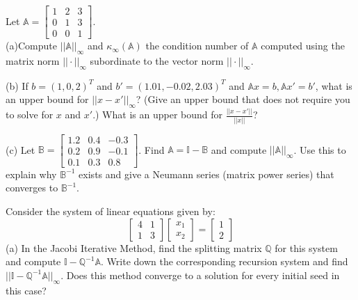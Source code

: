 \documentclass[12pt]{article}
\begin{document}
\vspace{2in}

Let $\mathbb{A} = \begin{bmatrix} 1 & 2 & 3 \\ 0 & 1 & 3 \\ 0 & 0 & 1 \end{bmatrix}$. \\
(a)Compute $||\mathbb{A}||_{\infty}$ and $\kappa_{\infty}(\mathbb{A})$ the condition number of $\mathbb{A}$ computed 
using the matrix norm $||\cdot ||_{\infty}$ subordinate to the vector norm $|| \cdot ||_{\infty}$. \\

\vspace{2in}

\noindent
(b) If $b=(1,0,2)^T$ and $b'=(1.01,-0.02, 2.03)^T$ and $\mathbb{A}x=b, \mathbb{A}x'=b'$, 
what is an upper bound for $||x-x'||_{\infty}$? (Give an upper bound that does not require you to solve for $x$ and $x'$.) What is an upper bound for $\frac{||x-x'||}{||x||}$?

\vspace{ 2in}

\noindent
(c) Let $\mathbb{B}= \begin{bmatrix} 1.2 & 0.4 & -0.3 \\ 0.2 & 0.9 & -0.1 \\ 0.1 & 0.3 & 0.8 \end{bmatrix}$.
Find $\mathbb{A}=\mathbb{I} - \mathbb{B}$ and compute $||\mathbb{A}||_{\infty}$. 
Use this to explain why $\mathbb{B}^{-1}$ exists and give a Neumann series (matrix power series) that converges to $\mathbb{B}^{-1}$. \\

\vspace{ 3 in}

\noindent
Consider the system of linear equations given by:
$$
\begin{bmatrix} 4 & 1  \\ 1 & 3   \end{bmatrix}
\begin{bmatrix} x_1 \\ x_2  \end{bmatrix}
=
\begin{bmatrix} 1 \\ 2  \end{bmatrix}
$$
(a) In the Jacobi Iterative Method, find the splitting matrix $\mathbb{Q}$ for this system and compute 
$\mathbb{I} - \mathbb{Q}^{-1} \mathbb{A}$. Write down the corresponding recursion system and 
find $|| \mathbb{I}-\mathbb{Q}^{-1}\mathbb{A}||_{\infty}$. Does this method converge to a solution 
for every initial seed in this case? \\
\end{document}

